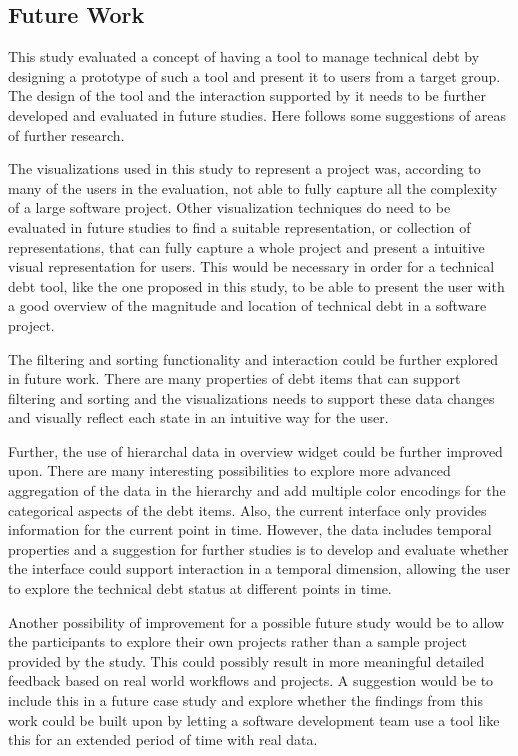 \subsection{Future Work}

This study evaluated a concept of having a tool to manage technical debt by designing a prototype of such a tool and present it to users from a target group.
The design of the tool and the interaction supported by it needs to be further developed and evaluated in future studies. Here follows some suggestions of areas of further research.

The visualizations used in this study to represent a project was, according to many of the users in the evaluation, not able to fully capture all the complexity of a large software project.
Other visualization techniques do need to be evaluated in future studies to find a suitable representation, or collection of representations, that can fully capture a whole project and present a intuitive visual representation for users.
This would be necessary in order for a technical debt tool, like the one proposed in this study, to be able to present the user with a good overview of the magnitude and location of technical debt in a software project.

The filtering and sorting functionality and interaction could be further explored in future work.
There are many properties of debt items that can support filtering and sorting and the visualizations needs to support these data changes and visually reflect each state in an intuitive way for the user.

Further, the use of hierarchal data in overview widget could be further improved upon.
There are many interesting possibilities to explore more advanced aggregation of the data in the hierarchy and add multiple color encodings for the categorical aspects of the debt items.
Also, the current interface only provides information for the current point in time. However, the data includes temporal properties and a suggestion for further studies is to develop and evaluate whether the interface could support interaction in a temporal dimension, allowing the user to explore the technical debt status at different points in time.

Another possibility of improvement for a possible future study would be to allow the participants to explore their own projects rather than a sample project provided by the study.
This could possibly result in more meaningful detailed feedback based on real world workflows and projects.
A suggestion would be to include this in a future case study and explore whether the findings from this work could be built upon by letting a software development team use a tool like this for an extended period of time with real data.
